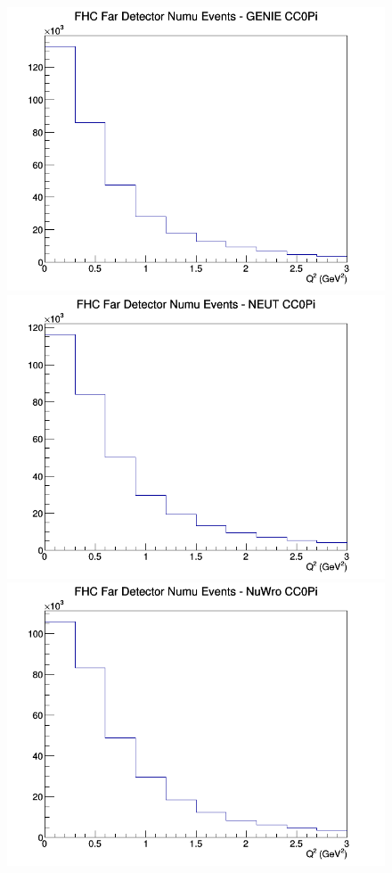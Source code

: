 \documentclass[12pt]{article}
\begin{document}
\begin{figure}[h]
\endminipage
\newline
{}
\includegraphics[width=\linewidth]{Q2/nominal/CC0Pi_FHC_FD_numu_Q2_GENIE.png}
\endminipage
{}
\includegraphics[width=\linewidth]{Q2/nominal/CC0Pi_FHC_FD_numu_Q2_NEUT.png}
\endminipage
{}
\includegraphics[width=\linewidth]{Q2/nominal/CC0Pi_FHC_FD_numu_Q2_NuWro.png}

\end{figure}
\end{document}
